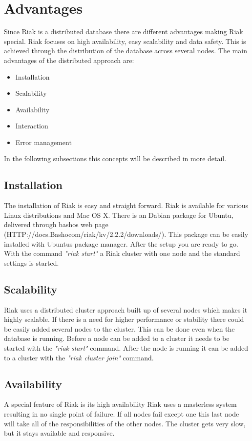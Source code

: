 \section{Advantages}
Since Riak is a distributed database there are different advantages making Riak special. Riak focuses on high availability, easy scalability and data safety. This is achieved through the distribution of the database across several nodes. \cite{Basho.01.04.2017}
The main advantages of the distributed approach are:
\begin{itemize}
	\item Installation
	\item Scalability
	\item Availability
	\item Interaction
	\item Error management
\end{itemize}
In the following subsections this concepts will be described in more detail. 
\subsection{Installation}
The installation of Riak is easy and straight forward. Riak is available for various Linux distributions and Mac OS X. There is an Dabian package for Ubuntu, delivered through bashos web page (HTTP://docs.Bashocom/riak/kv/2.2.2/downloads/). This package can be easily installed with Ubuntus package manager. After the setup you are ready to go. With the command \textit{"riak start"} a Riak cluster with one node and the standard settings is started. \cite{Basho.01.04.17c}
\subsection{Scalability}
Riak uses a distributed cluster approach built up of several nodes which makes it highly scalable. If there is a need for higher performance or stability there could be easily added several nodes to the cluster. This can be done even when the database is running. 
Before a node can be added to a cluster it needs to be started with the \textit{"riak start"} command. After the node is running it can be added to a cluster with the \textit{"riak cluster join"} command. \cite{Basho.01.04.17b}
\subsection{Availability}
A special feature of Riak is its high availability Riak uses a masterless system resulting in no single point of failure. If all nodes fail except one this last node will take all of the responsibilities of the other nodes. The cluster gets very slow, but it stays available and responsive.
